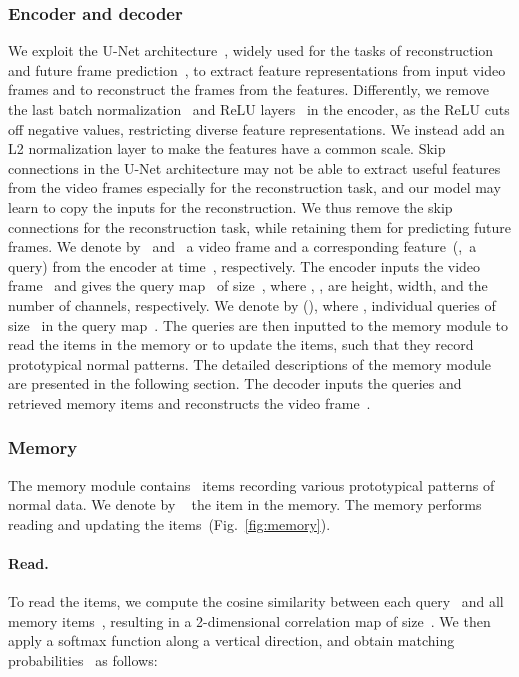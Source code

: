 \documentclass[10pt,twocolumn,letterpaper]{article}
\begin{document}
		\subsubsection{Encoder and decoder}\vspace{-0.2cm}
			We exploit the U-Net architecture~\cite{ronneberger2015u}, widely used for the tasks of reconstruction and future frame prediction~\cite{liu2018future}, to extract feature representations from input video frames and to reconstruct the frames from the features. Differently, we remove the last batch normalization~\cite{ioffe2015batch} and ReLU layers~\cite{krizhevsky2012imagenet} in the encoder, as the ReLU cuts off negative values, restricting diverse feature representations. We instead add an L2 normalization layer to make the features have a common scale. Skip connections in the U-Net architecture may not be able to extract useful features from the video frames especially for the reconstruction task, and our model may learn to copy the inputs for the reconstruction. We thus remove the skip connections for the reconstruction task, while retaining them for predicting future frames. We denote by~ and~ a video frame and a corresponding feature~(\ie,~a query) from the encoder at time~, respectively. The encoder inputs the video frame~ and gives the query map~ of size~, where , ,  are height, width, and the number of channels, respectively. We denote by  (), where , individual queries of size~ in the query map~. The queries are then inputted to the memory module to read the items in the memory or to update the items, such that they record prototypical normal patterns. The detailed descriptions of the memory module are presented in the following section. The decoder inputs the queries and retrieved memory items and reconstructs the video frame~.

    	\vspace{-0.4cm}
		\subsubsection{Memory}\vspace{-0.2cm}
			The memory module contains ~items recording various prototypical patterns of normal data. We denote by ~ the item in the memory. The memory performs reading and updating the items~(Fig.~\ref{fig:memory}). 

\vspace{-0.4cm}
			\paragraph{Read.} To read the items, we compute the cosine similarity between each query~ and all memory items~, resulting in a 2-dimensional correlation map of size~. We then apply a softmax function along a vertical direction, and obtain matching probabilities~ as follows:
				
\end{document}
